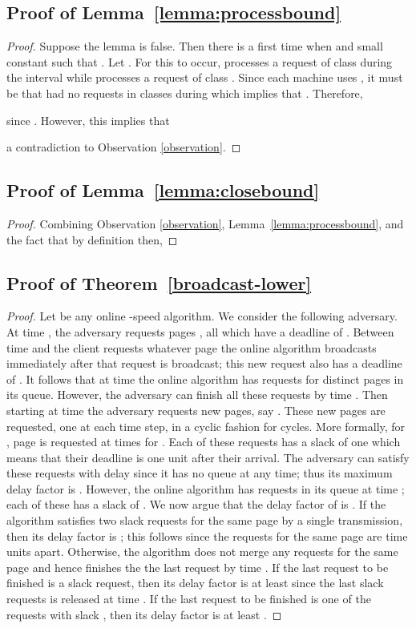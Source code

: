 \documentclass[11pt]{article}
\newcommand{\lemref}[1]{Lemma~\ref{lemma:#1}}
\begin{document}
\subsection{Proof of \lemref{processbound}}
\begin{proof}
  Suppose the lemma is false. Then there is a first time  when
   and small
  constant  such that . Let .
  For this to occur,  processes a request of class  during
  the interval  while  processes a request of class
  . Since each machine uses , it must be that  had no
  requests in classes  during  which implies that . Therefore,


since . However, this implies
that

a contradiction to Observation \ref{observation}.
\end{proof}

\subsection{Proof of \lemref{closebound}}

\begin{proof}
Combining Observation \ref{observation}, \lemref{processbound},
and the fact that  by definition then,


\end{proof}


\subsection{Proof of Theorem~\ref{broadcast-lower}}
\begin{proof}
  Let  be any online -speed algorithm. We consider the following
  adversary. At time , the adversary requests pages , all which have a deadline of . Between time
   and  the client requests whatever page the online
  algorithm  broadcasts immediately after that request is
  broadcast; this new request also has a deadline of . It
  follows that at time  the online algorithm  has
   requests for distinct pages in its queue. However, the
  adversary can finish all these requests by time . Then
  starting at time  the adversary requests 
  new pages, say .  These new pages are
  requested, one at each time step, in a cyclic fashion for 
  cycles.  More formally, for , page  is requested at times  for . Each of these requests has a slack of one which means
  that their deadline is one unit after their arrival.  The adversary
  can satisfy these requests with delay since it has no queue at any
  time; thus its maximum delay factor is .  However, the online
  algorithm  has  requests in its queue at time ; each of these has a slack of . We now argue that the
  delay factor of  is . If the algorithm satisfies two
  slack  requests for the same page by a single transmission, then
  its delay factor is ; this follows since the requests for the
  same page are  time units apart. Otherwise, the algorithm does
  not merge any requests for the same page and hence finishes the
  the last request by time . If the
  last request to be finished is a slack  request, then its delay
  factor is at least  since the last slack  requests is released
  at time . If the last request to be finished is
  one of the requests with slack , then its delay factor
  is at least .
\end{proof}
\end{document}
